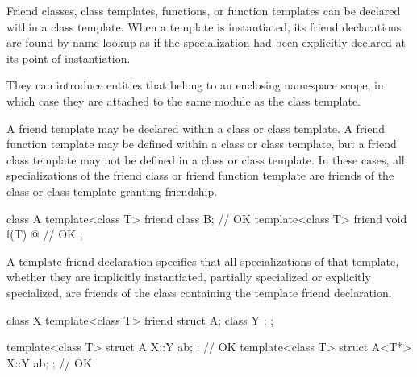 \pnum
Friend classes, class templates, functions, or function templates
can be declared within a class template.
When a template is instantiated,
its friend declarations are found by name lookup
as if the specialization had been explicitly declared at
its point of instantiation.
\begin{note}
They can introduce entities
that belong to an enclosing namespace scope,
in which case they are attached to
the same module as the class template.
\end{note}

\pnum
A friend template may be declared within a class or class template.
A friend function template may be defined within a class or class
template, but a friend class template may not be defined in a class
or class template.
In these cases, all specializations of the friend class or friend function
template are friends of the class or class template granting friendship.
\begin{example}
\begin{codeblock}
class A {
  template<class T> friend class B;                 // OK
  template<class T> friend void f(T) { @\commentellip@ }  // OK
};
\end{codeblock}
\end{example}

\pnum
A template friend declaration specifies that all specializations of that
template, whether they are implicitly instantiated, partially
specialized or explicitly specialized,
are friends of the class containing the template friend declaration.
\begin{example}
\begin{codeblock}
class X {
  template<class T> friend struct A;
  class Y { };
};

template<class T> struct A { X::Y ab; };            // OK
template<class T> struct A<T*> { X::Y ab; };        // OK
\end{codeblock}
\end{example}

